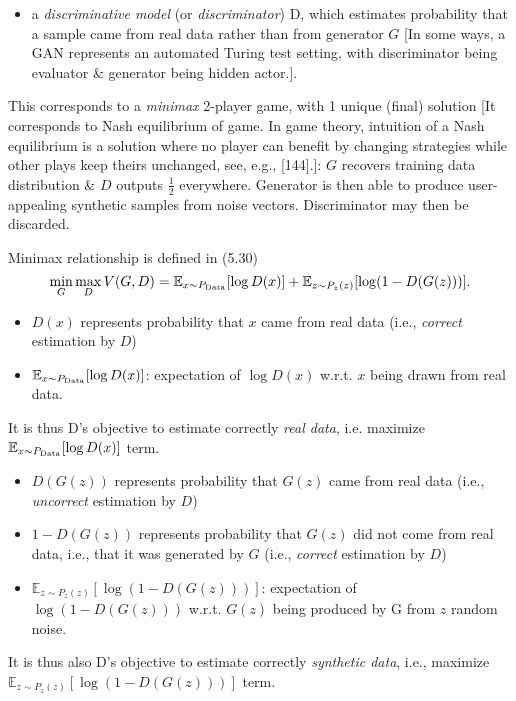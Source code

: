 \documentclass{article}
\begin{document}
\begin{itemize}
\begin{itemize}
\begin{itemize}
			\item a {\it discriminative model} (or {\it discriminator}) D, which estimates probability that a sample came from real data rather than from generator $G$ [In some ways, a GAN represents an automated Turing test setting, with discriminator being evaluator \& generator being hidden actor.].
		\end{itemize}
		This corresponds to a {\it minimax} 2-player game, with 1 unique (final) solution [It corresponds to Nash equilibrium of game. In game theory, intuition of a Nash equilibrium is a solution where no player can benefit by changing strategies while other plays keep theirs unchanged, see, e.g., [144].]: $G$ recovers training data distribution \& $D$ outputs $\frac{1}{2}$ everywhere. Generator is then able to produce user-appealing synthetic samples from noise vectors. Discriminator may then be discarded.

		Minimax relationship is defined in (5.30)
		\begin{equation*}
			\min_G\max_D V(G,D) = \mathbb{E}_{x\sim P_{\rm Data}}[\log D(x)] + \mathbb{E}_{z\sim P_z(z)}[\log(1 - D(G(z)))].
		\end{equation*}
		\begin{itemize}
			\item $D(x)$ represents probability that $x$ came from real data (i.e., {\it correct} estimation by $D$)
			\item $\mathbb{E}_{x\sim P_{\rm Data}}[\log D(x)]$: expectation of $\log D(x)$ w.r.t. $x$ being drawn from real data.
		\end{itemize}
		It is thus D's objective to estimate correctly {\it real data}, i.e. maximize $\mathbb{E}_{x\sim P_{\rm Data}}[\log D(x)]$ term.
		\begin{itemize}
			\item $D(G(z))$ represents probability that $G(z)$ came from real data (i.e., {\it uncorrect} estimation by $D$)
			\item $1 - D(G(z))$ represents probability that $G(z)$ did not come from real data, i.e., that it was generated by $G$ (i.e., {\it correct} estimation by $D$)
			\item $\mathbb{E}_{z\sim P_z(z)}[\log(1 - D(G(z)))]$: expectation of $\log(1 - D(G(z)))$ w.r.t. $G(z)$ being produced by G from $z$ random noise.
		\end{itemize}
		It is thus also D's objective to estimate correctly {\it synthetic data}, i.e., maximize $\mathbb{E}_{z\sim P_z(z)}[\log(1 - D(G(z)))]$ term.


\end{itemize}
\end{itemize}
\end{document}
